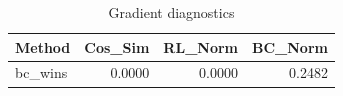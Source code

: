 \begin{table}[htbp]
\centering
\caption{Gradient diagnostics}
\label{tab:grad-diag}
\begin{tabular}{lrrr}
\toprule
\textbf{Method} & \textbf{Cos\_Sim} & \textbf{RL\_Norm} & \textbf{BC\_Norm} \\
\midrule
bc\_wins & 0.0000 & 0.0000 & 0.2482 \\
\bottomrule
\end{tabular}
\end{table}
